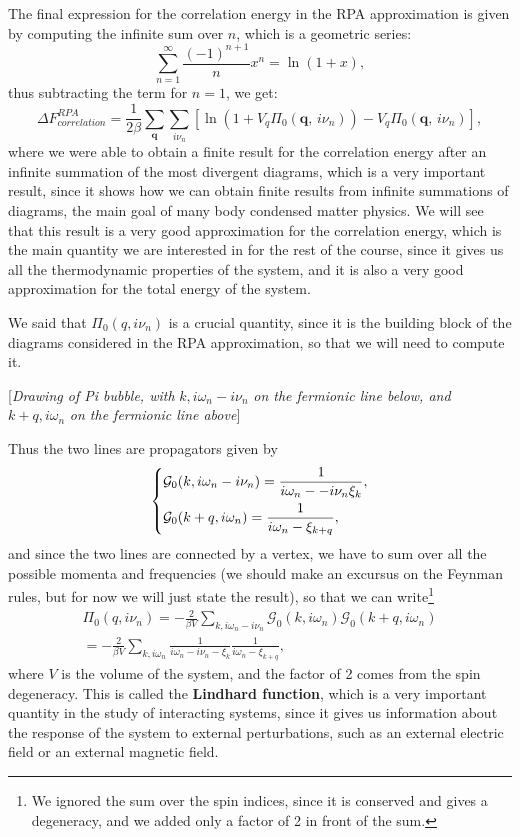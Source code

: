The final expression for the correlation energy in the RPA approximation is given by computing the infinite sum over \(n\), which is a geometric series:
\[
    \sum_{n=1}^{\infty} \frac{(-1)^{n+1}}{n} x^n = \ln (1 + x),
\]
thus subtracting the term for \(n=1\), we get:
\[
    \Delta F^{RPA}_{correlation} = \frac{1}{2\beta} \sum_{\mathbf{q}} \sum_{i \nu_n} \left[ \ln (1 + V_q \Pi_0(\mathbf{q},\, i \nu_n)) - V_q \Pi_0(\mathbf{q},\, i \nu_n) \right],
\]
where we were able to obtain a finite result for the correlation energy after an infinite summation of the most divergent diagrams, which is a very important result, since it shows how we can obtain finite results from infinite summations of diagrams, the main goal of many body condensed matter physics. We will see that this result is a very good approximation for the correlation energy, which is the main quantity we are interested in for the rest of the course, since it gives us all the thermodynamic properties of the system, and it is also a very good approximation for the total energy of the system.

We said that \(\Pi_0 (q, i \nu_n)\) is a crucial quantity, since it is the building block of the diagrams considered in the RPA approximation, so that we will need to compute it.

    [\textit{Drawing of Pi bubble, with }\(k, i \omega_n - i \nu_n\) \textit{on the fermionic line below, and }\(k+q, i \omega_n \) \textit{on the fermionic line above}]

Thus the two lines are propagators given by
\[
    \begin{dcases}
        \mathcal{G}_0(k, i \omega_n - i \nu_n) = \frac{1}{i \omega_n - - i \nu_n \xi_k}, \\
        \mathcal{G}_0(k+q, i \omega_n) = \frac{1}{i \omega_n - \xi_{k+q}},
    \end{dcases}
\]
and since the two lines are connected by a vertex, we have to sum over all the possible momenta and frequencies (we should make an excursus on the Feynman rules, but for now we will just state the result), so that we can write\footnote{We ignored the sum over the spin indices, since it is conserved and gives a degeneracy, and we added only a factor of 2 in front of the sum.}
\[
    \begin{aligned}
        \Pi_0(q, i \nu_n) = - \frac{2}{\beta V} \sum_{k, i \omega_n - i \nu_n} \mathcal{G}_0(k, i \omega_n) \mathcal{G}_0(k+q, i \omega_n) \\
        = - \frac{2}{\beta V} \sum_{k, i \omega_n} \frac{1}{i \omega_n - i \nu_n - \xi_k} \frac{1}{i \omega_n - \xi_{k+q}},
    \end{aligned}
\]
where \(V\) is the volume of the system, and the factor of 2 comes from the spin degeneracy. This is called the \textbf{Lindhard function}, which is a very important quantity in the study of interacting systems, since it gives us information about the response of the system to external perturbations, such as an external electric field or an external magnetic field.

